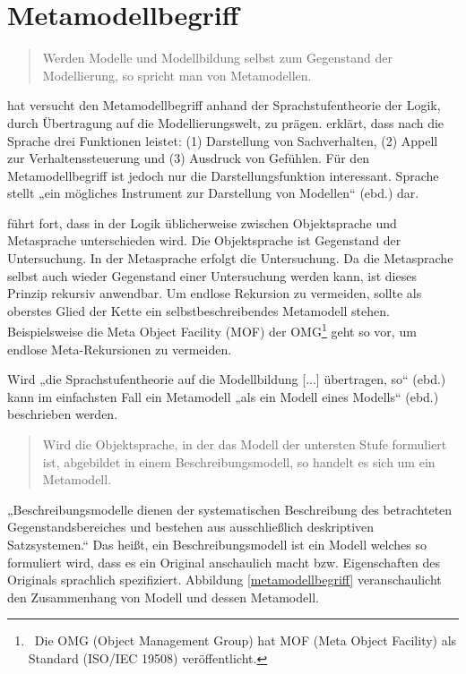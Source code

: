  
\section{Metamodellbegriff}\label{metamodellbegriff-sec}
 
\begin{quote}
 Werden Modelle und Modellbildung selbst zum Gegenstand der Modellierung, so spricht man von Metamodellen. \citep[S.~1]{Strahringer}
\end{quote}
 
\citep{Strahringer} hat versucht den Metamodellbegriff anhand der Sprachstufentheorie der Logik, durch Übertragung auf die Modellierungswelt, zu prägen. \citep[S.~1]{Strahringer} erklärt, dass nach \citep{Buehler} die Sprache drei Funktionen leistet: (1) Darstellung von Sachverhalten, (2) Appell zur Verhaltenssteuerung und (3) Ausdruck von Gefühlen. Für den Metamodellbegriff ist jedoch nur die Darstellungsfunktion interessant. Sprache stellt „ein mögliches Instrument zur Darstellung von Modellen“ (ebd.) dar.

 
\citep[S.~1]{Strahringer} führt fort, dass in der Logik üblicherweise zwischen Objektsprache und Metasprache unterschieden wird. Die Objektsprache ist Gegenstand der Untersuchung. In der Metasprache erfolgt die Untersuchung. Da die Metasprache selbst auch wieder Gegenstand einer Untersuchung werden kann, ist dieses Prinzip rekursiv anwendbar. Um endlose Rekursion zu vermeiden, sollte als oberstes Glied der Kette ein selbstbeschreibendes Metamodell stehen. Beispielsweise die Meta Object Facility (MOF) der OMG\footnote{~Die OMG (Object Management Group) hat MOF (Meta Object Facility) als Standard (ISO/IEC 19508) veröffentlicht. } geht so vor, um endlose Meta-Rekursionen zu vermeiden.

 
Wird „die Sprachstufentheorie auf die Modellbildung [...] übertragen, so“ (ebd.) kann im einfachsten Fall ein Metamodell „als ein Modell eines Modells“ (ebd.) beschrieben werden.

 
\begin{quote}
 Wird die Objektsprache, in der das Modell der untersten Stufe formuliert ist, abgebildet in einem Beschreibungsmodell, so handelt es sich um ein Metamodell. \citep[S.~3]{Strahringer}
\end{quote}
 
„Beschreibungsmodelle dienen der systematischen Beschreibung des betrachteten Gegenstandsbereiches und bestehen aus ausschließlich deskriptiven Satzsystemen.“ Das heißt, ein Beschreibungsmodell ist ein Modell welches so formuliert wird, dass es ein Original anschaulich macht bzw. Eigenschaften des Originals sprachlich spezifiziert. Abbildung \ref{metamodellbegriff} veranschaulicht den Zusammenhang von Modell und dessen Metamodell.

